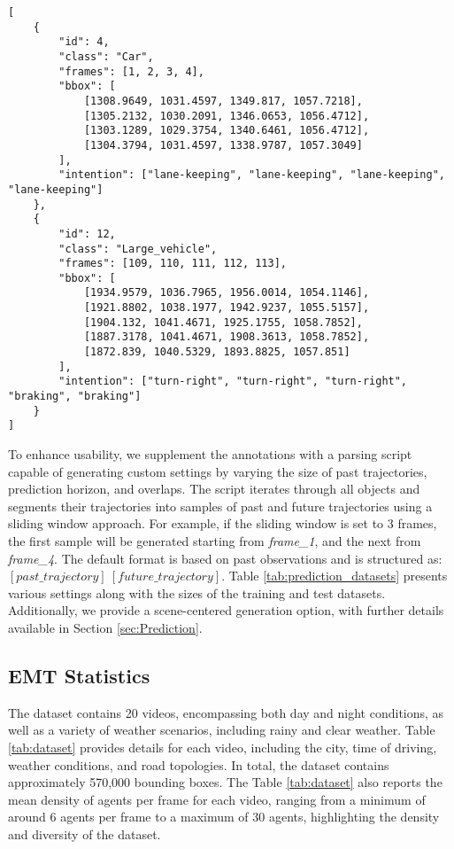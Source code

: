 \begin{lstlisting}
[
    {
        "id": 4,
        "class": "Car",
        "frames": [1, 2, 3, 4],
        "bbox": [
            [1308.9649, 1031.4597, 1349.817, 1057.7218],
            [1305.2132, 1030.2091, 1346.0653, 1056.4712],
            [1303.1289, 1029.3754, 1340.6461, 1056.4712],
            [1304.3794, 1031.4597, 1338.9787, 1057.3049]
        ],
        "intention": ["lane-keeping", "lane-keeping", "lane-keeping", "lane-keeping"]
    },
    {
        "id": 12,
        "class": "Large_vehicle",
        "frames": [109, 110, 111, 112, 113],
        "bbox": [
            [1934.9579, 1036.7965, 1956.0014, 1054.1146],
            [1921.8802, 1038.1977, 1942.9237, 1055.5157],
            [1904.132, 1041.4671, 1925.1755, 1058.7852],
            [1887.3178, 1041.4671, 1908.3613, 1058.7852],
            [1872.839, 1040.5329, 1893.8825, 1057.851]
        ],
        "intention": ["turn-right", "turn-right", "turn-right", "braking", "braking"]
    }
]
\end{lstlisting}

To enhance usability, we supplement the annotations with a parsing script capable of generating custom settings by varying the size of past trajectories, prediction horizon, and overlaps. The script iterates through all objects and segments their trajectories into samples of past and future trajectories using a sliding window approach. For example, if the sliding window is set to 3 frames, the first sample will be generated starting from \textit{frame\_1}, and the next from \textit{frame\_4}. The default format is based on past observations and is structured as: \([past\_trajectory]\ [future\_trajectory]\). Table \ref{tab:prediction_datasets} presents various settings along with the sizes of the training and test datasets. Additionally, we provide a scene-centered generation option, with further details available in Section \ref{sec:Prediction}.

\subsection{EMT Statistics}

The dataset contains 20 videos, encompassing both day and night conditions, as well as a variety of weather scenarios, including rainy and clear weather. Table \ref{tab:dataset} provides details for each video, including the city, time of driving, weather conditions, and road topologies. In total, the dataset contains approximately 570,000 bounding boxes. The Table \ref{tab:dataset} also reports the mean density of agents per frame for each video, ranging from a minimum of around 6 agents per frame to a maximum of 30 agents, highlighting the density and diversity of the dataset.

